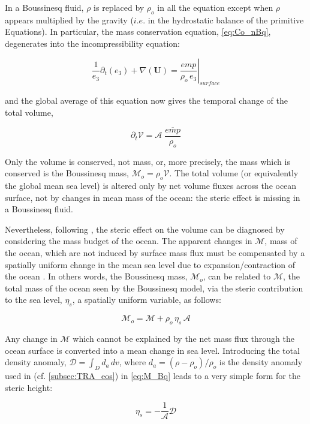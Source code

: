 \documentclass[../tex_main/NEMO_manual]{subfiles}
\begin{document}
In a Boussinesq fluid, $\rho$ is replaced by $\rho_o$ in all the equation except when 
$\rho$ appears multiplied by the gravity ($i.e.$ in the hydrostatic balance of the primitive Equations).
In particular, the mass conservation equation, \autoref{eq:Co_nBq}, degenerates into 
the incompressibility equation:

\[ \frac{1}{e_3} \partial_t ( e_3 ) + \nabla( \textbf{U} )
   = \left. \frac{\textit{emp}}{\rho_o \,e_3}\right|_ \textit{surface}
 \label{eq:Co_Bq} \]

and the global average of this equation now gives the temporal change of the total volume,

\[ \partial_t \mathcal{V} = \mathcal{A} \;\frac{\overline{\textit{emp}}}{\rho_o}
 \label{eq:V_Bq} \]

Only the volume is conserved, not mass, or, more precisely, the mass which is conserved is 
the Boussinesq mass, $\mathcal{M}_o = \rho_o \mathcal{V}$.
The total volume (or equivalently the global mean sea level) is altered only by net volume fluxes across 
the ocean surface, not by changes in mean mass of the ocean: the steric effect is missing in 
a Boussinesq fluid.

Nevertheless, following \citep{Greatbatch_JGR94}, the steric effect on the volume can be diagnosed by 
considering the mass budget of the ocean. 
The apparent changes in $\mathcal{M}$, mass of the ocean, which are not induced by 
surface mass flux must be compensated by a spatially uniform change in the mean sea level due to 
expansion/contraction of the ocean \citep{Greatbatch_JGR94}.
In others words, the Boussinesq mass, $\mathcal{M}_o$, can be related to $\mathcal{M}$, 
the  total mass of the ocean seen by the Boussinesq model, via the steric contribution to the sea level, 
$\eta_s$, a spatially uniform variable, as follows:

\[ \mathcal{M}_o = \mathcal{M} + \rho_o \,\eta_s \,\mathcal{A}
 \label{eq:M_Bq} \]

Any change in $\mathcal{M}$ which cannot be explained by the net mass flux through 
the ocean surface is converted into a mean change in sea level.
Introducing the total density anomaly, $\mathcal{D}= \int_D d_a \,dv$, where 
$d_a = (\rho -\rho_o ) / \rho_o$ is the density anomaly used in \NEMO (cf. \autoref{subsec:TRA_eos}) in 
\autoref{eq:M_Bq} leads to a very simple form for the steric height:

\[	\eta_s = - \frac{1}{\mathcal{A}} \mathcal{D}
 \label{eq:steric_Bq} \]
\end{document}
